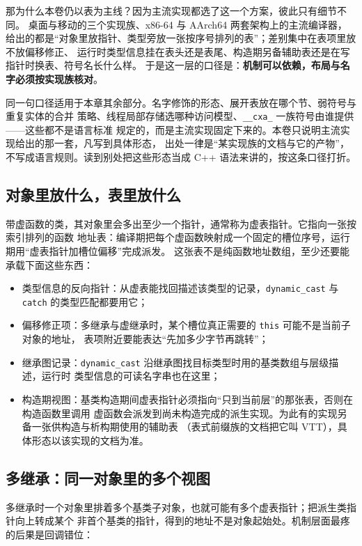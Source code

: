 \documentclass[12pt,a4paper,fontset=fandol]{ctexbook}
\newcommand{\Tp}[1]{\texttt{#1}}
\newcommand{\Lang}[1]{\textsf{#1}}
\newcommand{\CPP}{\Lang{C++}}
\newcommand{\Sw}[1]{\texttt{#1}}
\newcommand{\xSixtyFour}{\textsf{x86-64}}
\newcommand{\ArmSixtyFour}{\textsf{AArch64}}
\begin{document}
那为什么本卷仍以表为主线？因为主流实现都选了这一个方案，彼此只有细节不同。
桌面与移动的三个实现族、\xSixtyFour{} 与 \ArmSixtyFour{} 两套架构上的主流编译器，
给出的都是“对象里放指针、类型旁放一张按序号排列的表”；差别集中在表项里放不放偏移修正、
运行时类型信息挂在表头还是表尾、构造期另备辅助表还是在写指针时换表、符号名长什么样。
于是这一层的口径是：\textbf{机制可以依赖，布局与名字必须按实现族核对}。

同一句口径适用于本章其余部分。名字修饰的形态、展开表放在哪个节、弱符号与重复实体的合并
策略、线程局部存储选哪种访问模型、\Sw{\_\_cxa\_} 一族符号由谁提供——这些都不是语言标准
规定的，而是主流实现固定下来的。本卷只说明主流实现给出的那一套，凡写到具体形态，
出处一律是“某实现族的文档与它的产物”，不写成语言规则。读到别处把这些形态当成
\CPP{} 语法来讲的，按这条口径打折。

\subsection{对象里放什么，表里放什么}\label{sec:cl13-vtable-layout}

带虚函数的类，其对象里会多出至少一个指针，通常称为虚表指针。它指向一张按索引排列的函数
地址表：编译期把每个虚函数映射成一个固定的槽位序号，运行期用“虚表指针加槽位偏移”完成派发。
这张表不是纯函数地址数组，至少还要能承载下面这些东西：

\begin{itemize}
\item 类型信息的反向指针：从虚表能找回描述该类型的记录，\Tp{dynamic\_cast} 与 \Tp{catch}
的类型匹配都要用它；
\item 偏移修正项：多继承与虚继承时，某个槽位真正需要的 \Tp{this} 可能不是当前子对象的地址，
表项附近要能表达“先加多少字节再跳转”；
\item 继承图记录：\Tp{dynamic\_cast} 沿继承图找目标类型时用的基类数组与层级描述，运行时
类型信息的可读名字串也在这里；
\item 构造期视图：基类构造期间虚表指针必须指向“只到当前层”的那张表，否则在构造函数里调用
虚函数会派发到尚未构造完成的派生实现。为此有的实现另备一张供构造与析构期使用的辅助表
（表式前缀族的文档把它叫 VTT），具体形态以该实现的文档为准。
\end{itemize}

\subsection{多继承：同一对象里的多个视图}\label{sec:cl13-multi-inherit}

多继承时一个对象里排着多个基类子对象，也就可能有多个虚表指针；把派生类指针向上转成某个
非首个基类的指针，得到的地址不是对象起始处。机制层面最疼的后果是回调错位：
\end{document}
